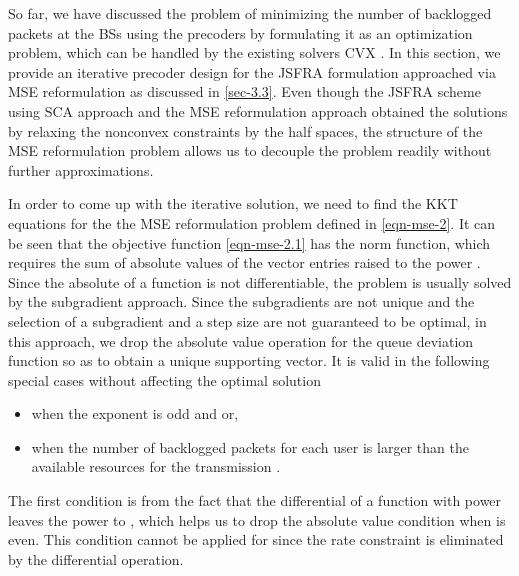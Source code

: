 So far, we have discussed the problem of minimizing the number of backlogged packets at the \acp{BS} using the precoders by formulating it as an optimization problem, which can be handled by the existing solvers CVX \cite{grant2008cvx}. In this section, we provide an iterative precoder design for the \ac{JSFRA} formulation approached via \ac{MSE} reformulation as discussed in \ref{sec-3.3}. Even though the \ac{JSFRA} scheme using \ac{SCA} approach and the \ac{MSE} reformulation approach obtained the solutions by relaxing the nonconvex constraints by the half spaces, the structure of the \ac{MSE} reformulation problem allows us to decouple the problem readily without further approximations.

In order to come up with the iterative solution, we need to find the \ac{KKT} equations for the the \ac{MSE} reformulation problem defined in \eqref{eqn-mse-2}. It can be seen that the objective function \eqref{eqn-mse-2.1} has the norm function, which requires the sum of absolute values of the vector entries raised to the power . Since the absolute of a function is not differentiable, the problem is usually solved by the subgradient approach. Since the subgradients are not unique and the selection of a subgradient and a step size are not guaranteed to be optimal, in this approach, we drop the absolute value operation for the queue deviation function so as to obtain a unique supporting vector. It is valid in the following special cases without affecting the optimal solution
\begin{itemize}
\item when the exponent  is odd and  or,
\item when the number of backlogged packets for each user is larger than the available resources for the transmission .
\end{itemize}
The first condition is from the fact that the differential of a function with power  leaves the power to , which helps us to drop the absolute value condition when  is even. This condition cannot be applied for  since the rate constraint is eliminated by the differential operation.


